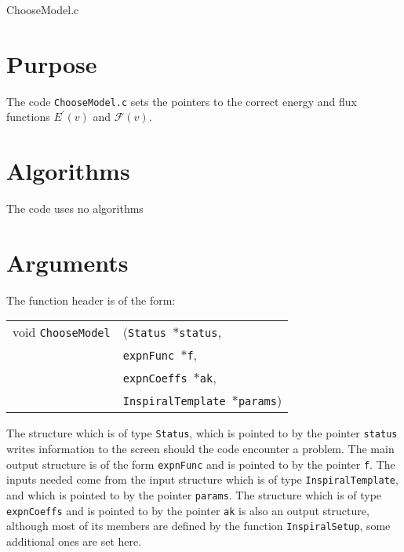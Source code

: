 \documentclass[12pt]{article}
\begin{document}
\huge
\begin{center}
ChooseModel.c
\end{center}
\normalsize
\vspace{10mm}

\section{Purpose}

The code \texttt{ChooseModel.c} sets the pointers to the correct energy and flux functions $E^{\prime}(v)$ and $\mathcal{F}(v)$. 

\section{Algorithms}

The code uses no algorithms


\section{Arguments}

The function header is of the form:

\vspace{5mm}

\begin{tabular}{ll}
void \texttt{ChooseModel}&(\texttt{Status $\ast$status},     \\
                                   &\texttt{expnFunc $\ast$f}, \\
                                   &\texttt{expnCoeffs $\ast$ak}, \\
                                   &\texttt{InspiralTemplate $\ast$params})
\end{tabular}

\vspace{5mm}

The structure which is of type \texttt{Status}, which is pointed to by the pointer \texttt{status} writes information to the screen should the code encounter
a problem. The main output structure is of the form \texttt{expnFunc} and is pointed to by the pointer \texttt{f}.
The inputs needed come from the input structure which is of type \texttt{InspiralTemplate}, and which is pointed to by the pointer \texttt{params}. The structure which is of type \texttt{expnCoeffs} and is pointed to by the pointer \texttt{ak} is also an output structure, although most of its members are defined by the function \texttt{InspiralSetup}, some additional ones are set here.
\end{document}
